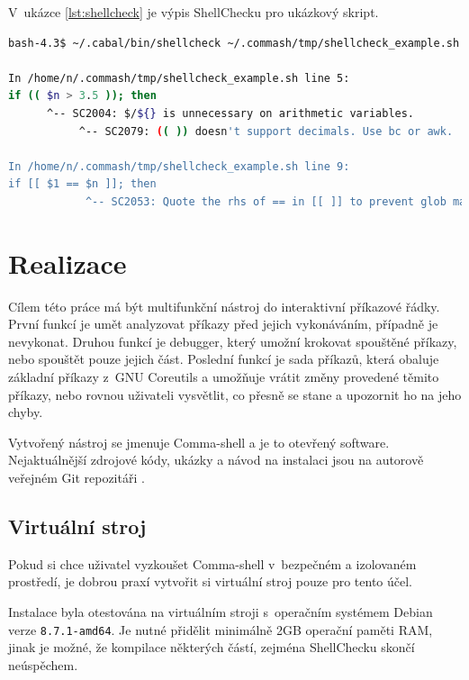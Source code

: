 \documentclass[thesis=M,czech]{FITthesis}[2012/06/26]
\begin{document}
V~ukázce \ref{lst:shellcheck} je výpis ShellChecku pro ukázkový skript.

\noindent
\begin{minipage}{\linewidth}
\begin{lstlisting}[language=bash, caption={ShellCheck}, label={lst:shellcheck}]
bash-4.3$ ~/.cabal/bin/shellcheck ~/.commash/tmp/shellcheck_example.sh

In /home/n/.commash/tmp/shellcheck_example.sh line 5:
if (( $n > 3.5 )); then
      ^-- SC2004: $/${} is unnecessary on arithmetic variables.
           ^-- SC2079: (( )) doesn't support decimals. Use bc or awk.

In /home/n/.commash/tmp/shellcheck_example.sh line 9:
if [[ $1 == $n ]]; then
            ^-- SC2053: Quote the rhs of == in [[ ]] to prevent glob matching.
\end{lstlisting}
\end{minipage}



\chapter{Realizace}

Cílem této práce má být multifunkční nástroj do interaktivní příkazové řádky. První funkcí je umět analyzovat příkazy před jejich vykonáváním, případně je nevykonat. Druhou funkcí je debugger, který umožní krokovat spouštěné příkazy, nebo spouštět pouze jejich část. Poslední funkcí je sada příkazů, která obaluje základní příkazy z~GNU Coreutils a umožňuje vrátit změny provedené těmito příkazy, nebo rovnou uživateli vysvětlit, co přesně se stane a upozornit ho na jeho chyby.

Vytvořený nástroj se jmenuje Comma-shell a je to otevřený software. Nejaktuálnější zdrojové kódy, ukázky a návod na instalaci jsou na autorově veřejném Git repozitáři \cite{commash}.

%
\section{Virtuální stroj}

Pokud si chce uživatel vyzkoušet Comma-shell v~bezpečném a izolovaném prostředí, je dobrou praxí vytvořit si virtuální stroj pouze pro tento účel.

Instalace byla otestována na virtuálním stroji s~operačním systémem Debian verze \texttt{8.7.1-amd64}. Je nutné přidělit  minimálně 2GB operační paměti RAM, jinak je možné, že kompilace některých částí, zejména ShellChecku skončí neúspěchem.
\end{document}
